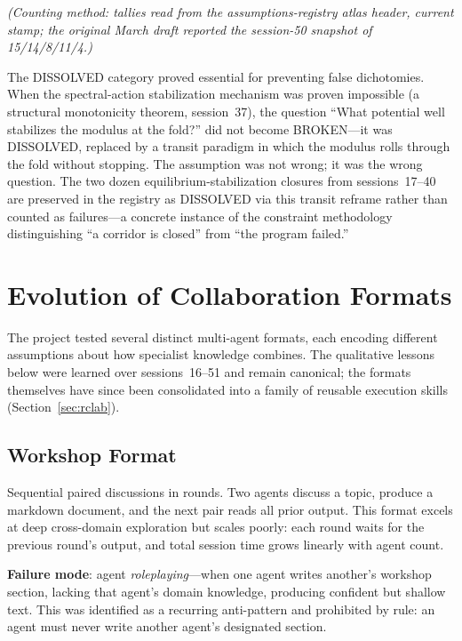 \documentclass[12pt,a4paper]{article}
\begin{document}
\noindent\textit{(Counting method: tallies read from the assumptions-registry atlas header, current stamp; the original March draft reported the session-50 snapshot of 15/14/8/11/4.)}

The DISSOLVED category proved essential for preventing false dichotomies. When the spectral-action stabilization mechanism was proven impossible (a structural monotonicity theorem, session~37), the question ``What potential well stabilizes the modulus at the fold?'' did not become BROKEN---it was DISSOLVED, replaced by a transit paradigm in which the modulus rolls through the fold without stopping. The assumption was not wrong; it was the wrong question. The two dozen equilibrium-stabilization closures from sessions~17--40 are preserved in the registry as DISSOLVED via this transit reframe rather than counted as failures---a concrete instance of the constraint methodology distinguishing ``a corridor is closed'' from ``the program failed.''

\section{Evolution of Collaboration Formats}
\label{sec:formats}

The project tested several distinct multi-agent formats, each encoding different assumptions about how specialist knowledge combines. The qualitative lessons below were learned over sessions~16--51 and remain canonical; the formats themselves have since been consolidated into a family of reusable execution skills (Section~\ref{sec:rclab}).

\subsection{Workshop Format}

Sequential paired discussions in rounds. Two agents discuss a topic, produce a markdown document, and the next pair reads all prior output. This format excels at deep cross-domain exploration but scales poorly: each round waits for the previous round's output, and total session time grows linearly with agent count.

\textbf{Failure mode}: agent \emph{roleplaying}---when one agent writes another's workshop section, lacking that agent's domain knowledge, producing confident but shallow text. This was identified as a recurring anti-pattern and prohibited by rule: an agent must never write another agent's designated section.
\end{document}
